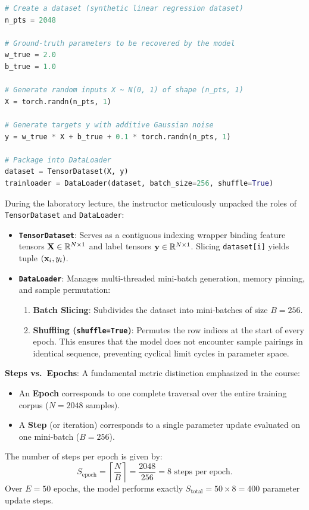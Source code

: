 \documentclass[../labs.tex]{subfiles}
\begin{document}
\begin{lstlisting}[language=Python, caption={Verified solution for synthetic dataset generation (Cell 22).}, label={lst:lab01_synthetic_dataset}]
# Create a dataset (synthetic linear regression dataset)
n_pts = 2048

# Ground-truth parameters to be recovered by the model
w_true = 2.0
b_true = 1.0

# Generate random inputs X ~ N(0, 1) of shape (n_pts, 1)
X = torch.randn(n_pts, 1)

# Generate targets y with additive Gaussian noise
y = w_true * X + b_true + 0.1 * torch.randn(n_pts, 1)

# Package into DataLoader
dataset = TensorDataset(X, y)
trainloader = DataLoader(dataset, batch_size=256, shuffle=True)
\end{lstlisting}

\begin{deepdive}
During the laboratory lecture, the instructor meticulously unpacked the roles of \texttt{TensorDataset} and \texttt{DataLoader}:
\begin{itemize}
    \item \textbf{\texttt{TensorDataset}}: Serves as a contiguous indexing wrapper binding feature tensors $\mathbf{X} \in \mathbb{R}^{N \times 1}$ and label tensors $\mathbf{y} \in \mathbb{R}^{N \times 1}$. Slicing \texttt{dataset[i]} yields tuple $(\mathbf{x}_i, y_i)$.
    \item \textbf{\texttt{DataLoader}}: Manages multi-threaded mini-batch generation, memory pinning, and sample permutation:
    \begin{enumerate}
        \item \textbf{Batch Slicing}: Subdivides the dataset into mini-batches of size $B = 256$.
        \item \textbf{Shuffling (\texttt{shuffle=True})}: Permutes the row indices at the start of every epoch. This ensures that the model does not encounter sample pairings in identical sequence, preventing cyclical limit cycles in parameter space.
    \end{enumerate}
\end{itemize}

\textbf{Steps vs.\ Epochs}: A fundamental metric distinction emphasized in the course:
\begin{itemize}
    \item An \textbf{Epoch} corresponds to one complete traversal over the entire training corpus ($N = 2048$ samples).
    \item A \textbf{Step} (or iteration) corresponds to a single parameter update evaluated on one mini-batch ($B = 256$).
\end{itemize}
The number of steps per epoch is given by:
\begin{equation}
S_{\text{epoch}} = \left\lceil \frac{N}{B} \right\rceil = \frac{2048}{256} = 8 \text{ steps per epoch}.
\end{equation}
Over $E = 50$ epochs, the model performs exactly $S_{\text{total}} = 50 \times 8 = 400$ parameter update steps.
\end{deepdive}
\end{document}
